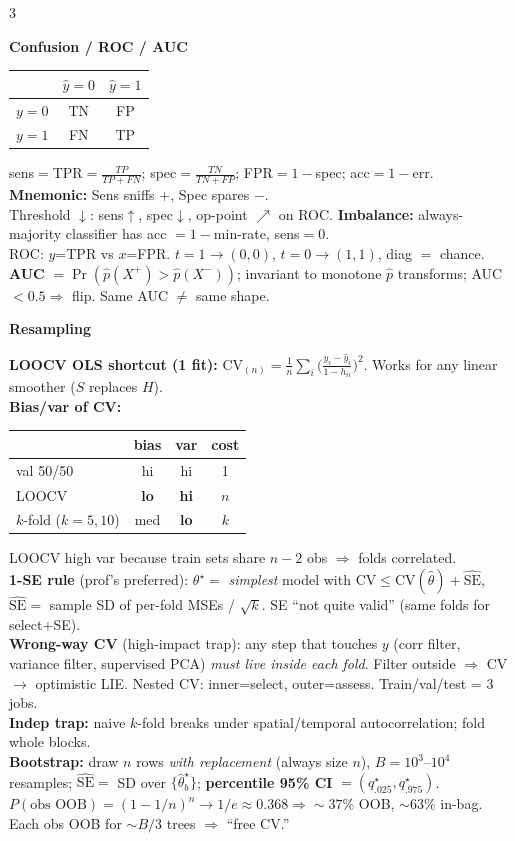 \documentclass[a4paper,9pt]{extarticle}
\newcommand{\hd}[1]{\textbf{#1}}
\newcommand{\sect}[1]{\par\vspace{1pt}\noindent\colorbox{black!10}{\parbox{\dimexpr\linewidth-2\fboxsep\relax}{\strut\textbf{#1}\strut}}\par\vspace{1pt}}
\begin{document}
\begin{multicols*}{3}
\sect{Confusion / ROC / AUC}
\begin{tabular}{l|cc}
& $\hat y\!=\!0$ & $\hat y\!=\!1$ \\\hline
$y\!=\!0$ & TN & FP \\
$y\!=\!1$ & FN & TP
\end{tabular}\quad
sens$=$TPR$=\tfrac{TP}{TP+FN}$; spec$=\tfrac{TN}{TN+FP}$; FPR$=1{-}$spec; acc$=1{-}$err. \hd{Mnemonic:} Sens sniffs +, Spec spares $-$.\\
Threshold $\downarrow$: sens$\uparrow$, spec$\downarrow$, op-point $\nearrow$ on ROC. \hd{Imbalance:} always-majority classifier has acc $=1{-}$min-rate, sens$=0$.\\
ROC: $y$=TPR vs $x$=FPR. $t\!=\!1\to(0,0)$, $t\!=\!0\to(1,1)$, diag $=$ chance. \hd{AUC} $=\Pr(\hat p(X^+){>}\hat p(X^-))$; invariant to monotone $\hat p$ transforms; AUC$<0.5\Rightarrow$ flip. Same AUC $\ne$ same shape.

\sect{Resampling}
\hd{LOOCV OLS shortcut (1 fit):} $\mathrm{CV}_{(n)}=\tfrac1n\sum_i\!\big(\tfrac{y_i-\hat y_i}{1-h_{ii}}\big)^2$. Works for any linear smoother ($S$ replaces $H$).\\
\hd{Bias/var of CV:}\par
{\centering\begin{tabular}{@{}l|ccc@{}}
& bias & var & cost \\\hline
val 50/50 & hi & hi & 1\\
LOOCV & \hd{lo} & \hd{hi} & $n$\\
$k$-fold ($k{=}5,10$) & med & \hd{lo} & $k$
\end{tabular}\par}
LOOCV high var because train sets share $n{-}2$ obs $\Rightarrow$ folds correlated.\\
\hd{1-SE rule} (prof's preferred): $\theta^\star=$ \emph{simplest} model with $\mathrm{CV}\le\mathrm{CV}(\hat\theta)+\widehat{\mathrm{SE}}$, $\widehat{\mathrm{SE}}=$ sample SD of per-fold MSEs / $\sqrt k$. SE ``not quite valid'' (same folds for select+SE).\\
\hd{Wrong-way CV} (high-impact trap): any step that touches $y$ (corr filter, variance filter, supervised PCA) \emph{must live inside each fold}. Filter outside $\Rightarrow$ CV $\to$ optimistic LIE. Nested CV: inner=select, outer=assess. Train/val/test = 3 jobs.\\
\hd{Indep trap:} naive $k$-fold breaks under spatial/temporal autocorrelation; fold whole blocks.\\
\hd{Bootstrap:} draw $n$ rows \emph{with replacement} (always size $n$), $B{=}10^3$--$10^4$ resamples; $\widehat{\mathrm{SE}}=$ SD over $\{\hat\theta^\star_b\}$; \hd{percentile 95\% CI} $=(q^\star_{.025},q^\star_{.975})$. $P(\text{obs OOB})=(1-1/n)^n\to1/e\approx0.368\Rightarrow\sim37\%$ OOB, $\sim63\%$ in-bag. Each obs OOB for $\sim B/3$ trees $\Rightarrow$ ``free CV.''


\end{multicols*}
\end{document}
